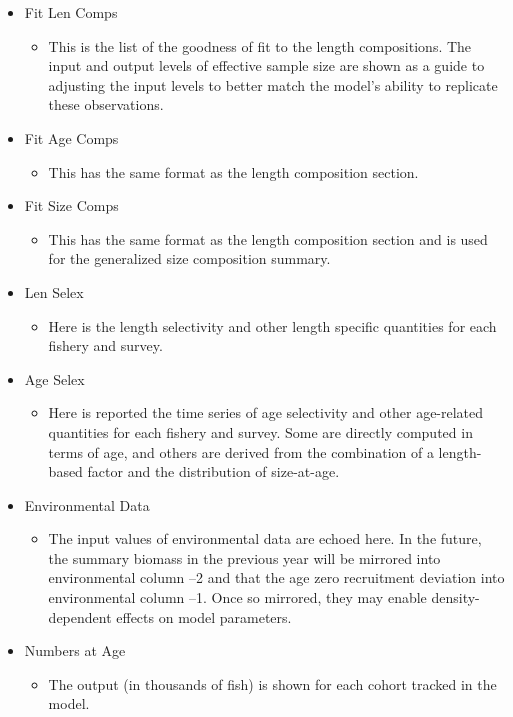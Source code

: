 \begin{itemize}
\begin{itemize}
	\end{itemize}
	\item Fit Len Comps
	\begin{itemize}
		\item This is the list of the goodness of fit to the length compositions. The input and output levels of effective sample size are shown as a guide to adjusting the input levels to better match the model's ability to replicate these observations.
	\end{itemize}
	\item Fit Age Comps
	\begin{itemize}
		\item This has the same format as the length composition section.
	\end{itemize}
	\item Fit Size Comps
	\begin{itemize}
		\item This has the same format as the length composition section and is used for the generalized size composition summary.
	\end{itemize}
	\item Len Selex
	\begin{itemize}
		\item Here is the length selectivity and other length specific quantities for each fishery and survey.
	\end{itemize}
	\item Age Selex
	\begin{itemize}
		\item Here is reported the time series of age selectivity and other age-related quantities for each fishery and survey. Some are directly computed in terms of age, and others are derived from the combination of a length-based factor and the distribution of size-at-age.
	\end{itemize}
	\item Environmental Data
	\begin{itemize}
		\item The input values of environmental data are echoed here. In the future, the summary biomass in the previous year will be mirrored into environmental column –2 and that the age zero recruitment deviation into environmental column –1. Once so mirrored, they may enable density-dependent effects on model parameters.
	\end{itemize}
	\item Numbers at Age
	\begin{itemize}
		\item The output (in thousands of fish) is shown for each cohort tracked in the model.

\end{itemize}
\end{itemize}
